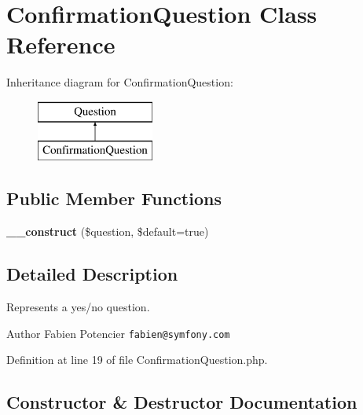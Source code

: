 \section{Confirmation\+Question Class Reference}
\label{class_symfony_1_1_component_1_1_console_1_1_question_1_1_confirmation_question}
Inheritance diagram for Confirmation\+Question\+:\begin{figure}[H]
\begin{center}
\leavevmode
\includegraphics[height=2.000000cm]{class_symfony_1_1_component_1_1_console_1_1_question_1_1_confirmation_question}
\end{center}
\end{figure}
\subsection*{Public Member Functions}
\begin{DoxyCompactItemize}
\item 
{\bf \+\_\+\+\_\+construct} (\$question, \$default=true)
\end{DoxyCompactItemize}


\subsection{Detailed Description}
Represents a yes/no question.

\begin{DoxyAuthor}{Author}
Fabien Potencier {\tt fabien@symfony.\+com} 
\end{DoxyAuthor}


Definition at line 19 of file Confirmation\+Question.\+php.



\subsection{Constructor \& Destructor Documentation}
